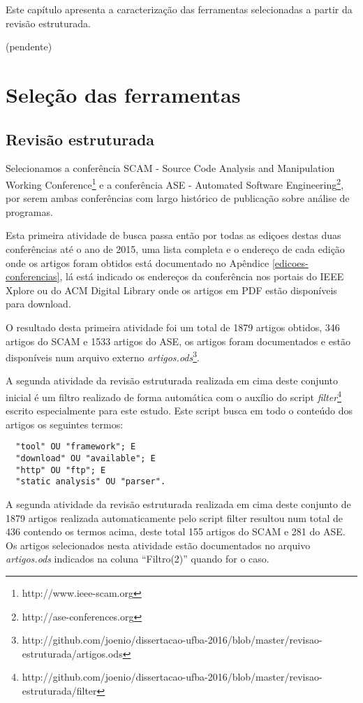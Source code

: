 {Este capítulo apresenta a caracterização das ferramentas selecionadas a partir
da revisão estruturada.}
\label{caracterizacao-ferramentas}

(pendente)

\section{Seleção das ferramentas}

\subsection{Revisão estruturada}

Selecionamos a conferência SCAM - Source Code Analysis and Manipulation Working
Conference\footnote{http://www.ieee-scam.org} e a conferência ASE - Automated
Software Engineering\footnote{http://ase-conferences.org}, por serem ambas
conferências com largo histórico de publicação sobre análise de programas.

Esta primeira atividade de busca passa então por todas as ediçoes destas duas
conferências até o ano de 2015, uma lista
completa e o endereço de cada edição onde os artigos foram obtidos está
documentado no Apêndice \ref{edicoes-conferencias}, lá está indicado os
endereços da conferência nos portais do IEEE Xplore ou do ACM Digital Library
onde os artigos em PDF estão disponíveis para download.

O resultado desta primeira atividade foi um total de 1879 artigos obtidos, 346
artigos do SCAM e 1533 artigos do ASE, os artigos foram documentados e estão disponíveis num arquivo externo
{\it artigos.ods}\footnote{http://github.com/joenio/dissertacao-ufba-2016/blob/master/revisao-estruturada/artigos.ods}.

A segunda atividade da revisão estruturada realizada em cima deste conjunto inicial
é um filtro realizado de forma automática com o auxílio do script
{\it
filter}\footnote{http://github.com/joenio/dissertacao-ufba-2016/blob/master/revisao-estruturada/filter}
escrito especialmente para este estudo. Este script busca em todo o conteúdo
dos artigos os seguintes termos:

\begin{verbatim}
  "tool" OU "framework"; E
  "download" OU "available"; E
  "http" OU "ftp"; E
  "static analysis" OU "parser".
\end{verbatim}


A segunda atividade da revisão estruturada realizada em cima deste conjunto de
1879 artigos realizada automaticamente pelo script filter
resultou num total de 436 contendo os termos acima, deste
total 155 artigos do SCAM e 281 do ASE. Os artigos selecionados nesta atividade
estão documentados no arquivo {\it artigos.ods} indicados na coluna ``Filtro(2)''
quando for o caso.

